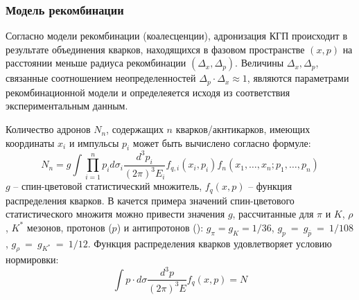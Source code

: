 \subsubsection{Модель рекомбинации} \label{ch1/Recombination}
Согласно модели рекомбинации (коалесценции)\cite{Recombination1, Recombination2}, адронизация КГП происходит в результате объединения кварков, находящихся в фазовом пространстве $(x, p)$ на расстоянии меньше радиуса рекомбинации $(\Delta_x, \Delta_p)$. Величины $\Delta_x, \Delta_p$, связанные соотношением неопределенностей $\Delta_p \cdot \Delta_x \approx 1$, являются параметрами рекомбинационной модели и определеяется исходя из соответствия экспериментальным данным.


\begin{comment}
	Количество мезонов, имеющих определенный импульс P может быть вычислено согласно следующей формуле
	$$\frac{dN_M}{d^3 P}=\sum_{a,b}\int \frac{d^3 R}{2\pi^3} \frac{d^3 q d^3 r}{2\pi^3}  W_{ab}(R-\frac{r}{2},\frac{P}{2}-q;R+\frac{r}{2},\frac{P}{2}+q) \Phi_M (r,q) $$
	Где индекс $M$ обозначает мезон, а индексы $a$ и $b$ обозначают коалесцирующие валентные кварки. $W_{ab}$ и $\Phi_M$ – функции Вигнера для партонов и мезона соответственно, $P$ и $R$ – импульс и координата мезона, $q$ и $r$ – доли импульса, которые несут кварки, и координаты кварков. Суммирование производится по всем возможным комбинациям 
\end{comment}

Количество адронов $N_n$, содержащих $n$ кварков/акнтикарков, имеющих координаты $x_i$ и импульсы $p_i$  может быть вычислено согласно формуле:
$$ N_n=g\int \prod_{i=1}^n p_i d\sigma_i  \frac{d^3 p_i}{(2\pi)^3 E_i }  f_{q,i} (x_i,p_i ) f_n(x_1,…,x_n;p_1,…,p_n ) $$
$g$ -- спин-цветовой статистический множитель, $f_q (x,p)$ -- функция распределения кварков. В качется примера значений спин-цветового статистического множитя можно привести значения $g$, рассчитанные для $\pi$ и $K$, $\rho$, $K^*$ мезонов, протонов ($p$) и антипротонов (\aprot): $g_\pi=g_K=1/36$, $g_p~=~g_{\bar{p}}~=~1/108$, $g_\rho~=~g_{K^*}~=~1/12$.
Функция распределения кварков удовлетворяет условию нормировки: 
$$\int p\cdot d\sigma \frac{d^3 p}{(2\pi)^3 E} f_q(x,p)=N$$

